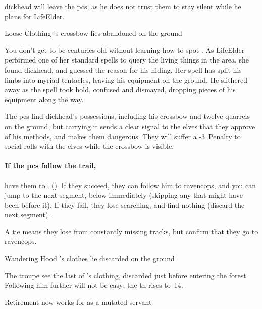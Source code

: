 \begin{multicols}{2}
\Gls{dickhead} will leave the \glspl{pc}, as he does not trust them to stay silent while he plans  for \gls{LifeElder}.

{Loose Clothing}%
{'s crossbow lies abandoned on the ground}%

\begin{exampletext}
  You don't get to be centuries old without learning how to spot .
  As \gls{LifeElder} performed one of her standard spells to query the living things in the area, she found \gls{dickhead}, and guessed the reason for his hiding.
  Her spell has split his limbs into myriad tentacles, leaving his equipment on the ground.
  He slithered away as the spell took hold, confused and dismayed, dropping pieces of his equipment along the way.
\end{exampletext}

The \glspl{pc} find \gls{dickhead}'s possessions, including his \gls{crossbow} and twelve quarrels on the ground, but carrying it sends a clear signal to the elves that they approve of his methods, and makes them dangerous.
They will suffer a -3~Penalty to social rolls with the elves while the \gls{crossbow} is visible.

\paragraph{If the \glspl{pc} follow the trail,}
have them roll  (\tn[10]).
If they succeed, they can follow him to \gls{ravencops}, and you can jump to the next \gls{segment}, below immediately (skipping any that might have been before it).
If they fail, they lose  searching, and find nothing (discard the next \gls{segment}).

A tie means they lose  from constantly missing tracks, but confirm that they go to \gls{ravencops}.

{Wandering Hood}%
{'s clothes lie discarded on the ground}%

The troupe see the last of 's clothing, discarded just before entering the forest.
Following him further will not be easy; the \gls{tn} rises to~14.

{Retirement}%
{ now works for  as a mutated servant}%


\end{multicols}
